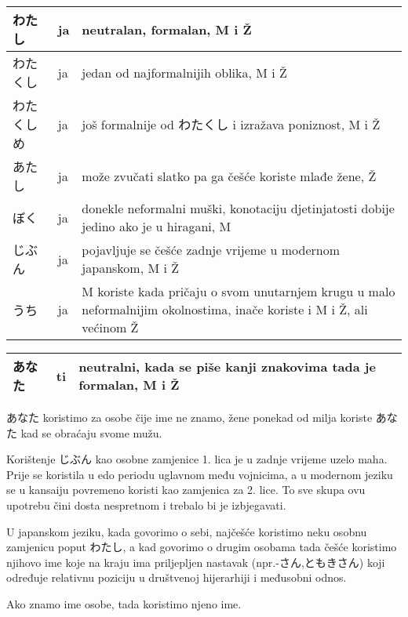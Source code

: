 	
	\begin{tabular}{|l|l|p{400pt}|}
		\hline
		わたし&ja&neutralan, formalan, M i Ž\\\hline
		わたくし&ja&jedan od najformalnijih oblika, M i Ž\\\hline
		わたくしめ&ja&još formalnije od わたくし i izražava poniznost, M i Ž\\\hline
		あたし&ja&može zvučati slatko pa ga češće koriste mlađe žene, Ž\\\hline
		ぼく&ja&donekle neformalni muški, konotaciju djetinjatosti dobije jedino ako je u hiragani, M\\\hline
		じぶん&ja&pojavljuje se češće zadnje vrijeme u modernom japanskom, M i Ž\\\hline
		うち&ja&M koriste kada pričaju o svom unutarnjem krugu u malo neformalnijim okolnostima, inače koriste i M i Ž, ali većinom Ž\\\hline
	\end{tabular}
	
	\vspace{10pt}
	
		\begin{tabular}{|l|l|l|}
		\hline
		あなた&ti&neutralni, kada se piše kanji znakovima tada je formalan, M i Ž\\\hline
		\end{tabular}
		
		
	\vspace{10pt}
	
	あなた koristimo za osobe čije ime ne znamo, žene ponekad od milja koriste あなた kad se obraćaju svome mužu.
	
	Korištenje じぶん kao osobne zamjenice 1. lica je u zadnje vrijeme uzelo maha. Prije se koristila u edo periodu uglavnom među vojnicima, a u modernom jeziku se u kansaiju povremeno koristi kao zamjenica za 2. lice. To sve skupa ovu upotrebu čini dosta nespretnom i trebalo bi je izbjegavati.
	
	\vspace{10pt}
	
	U japanskom jeziku, kada govorimo o sebi, najčešće koristimo neku osobnu zamjenicu poput わたし, a kad govorimo o drugim osobama tada češće koristimo njihovo ime koje na kraju ima priljepljen nastavak (npr.-さん,ともきさん) koji određuje relativnu poziciju u društvenoj hijerarhiji i međusobni odnos.
	
	\vspace{10pt}
	Ako znamo ime osobe, tada koristimo njeno ime. 
	
